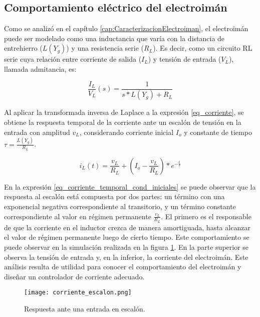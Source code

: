 \subsection{Comportamiento eléctrico del electroimán}\label{sec_comportamiento-electrico-electroiman}

Como se analizó en el capítulo \ref{cap:CaracterizacionElectroiman}, el electroimán puede ser modelado como una inductancia que varía con la distancia de entrehierro ($L(Y_g)$) y una resistencia serie ($R_L$). Es decir, como un circuito RL serie cuya  relación entre corriente de salida ($I_L$) y tensión de entrada ($V_L$), llamada admitancia, es:

\begin{equation} \label{eq_corriente}
	\frac{I_L}{V_L}(s)=\frac{1}{s*L(Y_g)+R_L}
\end{equation}

Al aplicar la transformada inversa de Laplace a la expresión  \ref{eq_corriente}, se obtiene la respuesta temporal de la corriente ante un escalón de tensión en la entrada con amplitud $v_L$, considerando corriente inicial $I_o$ y constante de tiempo $\tau=\frac{L(Y_g)}{R_L}$.

\begin{equation} \label{eq_corriente_temporal_cond_iniciales}
	i_L(t)=\frac{v_L}{R_L} + (I_o-\frac{v_L}{R_L})*e^{-\frac{t}{\tau}}
\end{equation}

En la expresión \ref{eq_corriente_temporal_cond_iniciales} se puede observar que la respuesta al escalón está compuesta por dos partes: un término con una exponencial negativa correspondiente al transitorio, y un término constante correspondiente al valor en régimen permanente $\frac{v_L}{R_L}$. El primero es el responsable de que la corriente en el inductor crezca de manera amortiguada, hasta alcanzar el valor de régimen permanente luego de cierto tiempo. Este comportamiento se puede observar en la simulación realizada en la figura \ref{fig:img_respuesta_escalon}. En la parte superior se observa la tensión de entrada y, en la inferior, la corriente del electroimán. Este análisis resulta de utilidad para conocer el comportamiento del electroimán y diseñar un controlador de corriente adecuado.


\begin{figure}[H]
	\centering
	\texttt{[image: corriente\_escalon.png]}
	\caption{Respuesta ante una entrada en escalón.}
	\label{fig:img_respuesta_escalon}
\end{figure}


